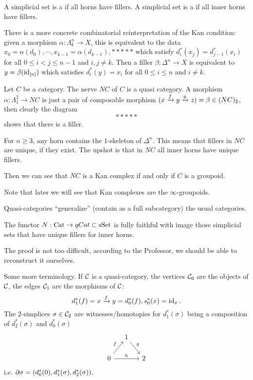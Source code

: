 {%

A simplicial set is a  if all horns have fillers. A simplicial set is a  if all inner horns have fillers.

There is a more concrete combinatorial reinterpretation of the Kan condition: given a morphism $\alpha:\Lambda^n_k\to X$, this is equivalent to the data $x_0=\alpha(d_0),\cdots,x_{k-1}=\alpha(d_{k-1}),*****$ which satisfy $d_i^*(x_j)=d_{j-1}^*(x_i)$ for all $0\le i<j\le n-1$ and $i,j\ne k$. Then a filler $\beta:\Delta^n\to X$ is equivalent to $y=\beta(\operatorname{id}_{[n]})$ which satisfies $d_i^*(y)=x_i$ for all $0\le i\le n$ and $i\ne k$.

\begin{example}
Let $C$ be a category. The nerve $NC$ of $C$ is a quasi category. A morphism $\alpha:\Lambda^2_1\to NC$ is just a pair of composable morphism $(x\xrightarrow{f}y\xrightarrow{g}z)=\beta\in (NC)_2$, then clearly the diagram
\[*****\]
shows that there is a filler.

For $n\ge3$, any horn contains the $1$-skeleton of $\Delta^n$. This means that fillers in $NC$ are unique, if they exist. The upshot is that in $NC$ all inner horns have unique fillers.

Then we can see that $NC$ is a Kan complex if and only if $C$ is a groupoid.

Note that later we will see that Kan complexes are the $\infty$-groupoids.
\end{example}

Quasi-categories \enquote{generalize} (contain as a full subcategory) the usual categories.

\begin{proposition}
The functor $N:{\mathrm{Cat}}\to qCat\subset{\mathrm{sSet}}$ is fully faithful with image those simplicial sets that have unique fillers for inner horns.
\end{proposition}

The proof is not too difficult, according to the Professor, we should be able to reconstruct it ourselves.

Some more terminology. If $\mathcal{C}$ is a quasi-category, the vertices $\mathcal{C}_0$ are the objects of $\mathcal{C}$, the edges $\mathcal{C}_1$ are the morphisms of $\mathcal{C}$:
\[d_1^*(f)=x\xrightarrow{f}y=d_0^*(f), s_0^*(x)=\operatorname{id}_x.\]
The $2$-simplices $\sigma\in\mathcal{C}_2$ are witnesses/homotopies for $d_1^*(\sigma)$ being a composition of $d_2^*(\sigma)$ and $d_0^*(\sigma)$
\[
\begin{tikzcd}[column sep=small]
& 1 \ar[dr,"g"] & \\
0 \ar[ur,"f"] \ar[rr,"h"] & & 2
\end{tikzcd}
\]
i.e. $\partial\sigma=(d_0^*(0),d_1^*(\sigma),d_2^*(\sigma))$.

}
